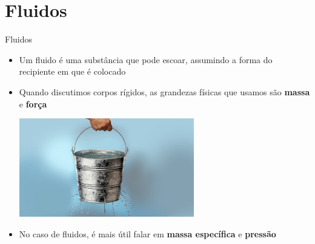 \documentclass[t,%
brazilian,%
11pt,%
aspectratio=169,%
table%
]{beamer}
\begin{document}
\section{Fluidos}

\begin{frame}{Fluidos}
    \begin{itemize}
        \item Um fluido é uma substância que pode escoar, assumindo a forma do recipiente em que é colocado
        \item Quando discutimos corpos rígidos, as grandezas físicas que usamos são \textbf{massa} e \textbf{força}
            \begin{center}
                \includegraphics[width=0.6\textwidth]{images/balde_furado.jpg}
            \end{center}
        \item No caso de fluidos, é mais útil falar em \textbf{massa específica} e \textbf{pressão}
    \end{itemize}
\end{frame}
\end{document}
